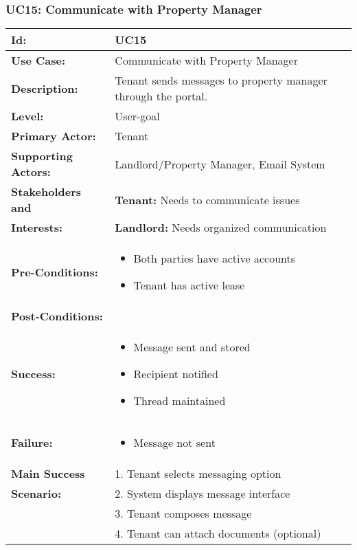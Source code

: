\documentclass[12pt]{article}
\begin{document}
\subsubsection{UC15: Communicate with Property Manager}

\begin{tabular}{|p{3cm}|p{11cm}|}
\hline
\textbf{Id:} & UC15 \\
\hline
\textbf{Use Case:} & Communicate with Property Manager \\
\hline
\textbf{Description:} & Tenant sends messages to property manager through the portal. \\
\hline
\textbf{Level:} & User-goal \\
\hline
\textbf{Primary Actor:} & Tenant \\
\hline
\textbf{Supporting Actors:} & Landlord/Property Manager, Email System \\
\hline
\textbf{Stakeholders and} & \textbf{Tenant:} Needs to communicate issues \\
\textbf{Interests:} & \textbf{Landlord:} Needs organized communication \\
\hline
\textbf{Pre-Conditions:} & 
\begin{itemize}
    \item Both parties have active accounts
    \item Tenant has active lease
\end{itemize} \\
\hline
\textbf{Post-Conditions:} & \\
\textbf{Success:} & 
\begin{itemize}
    \item Message sent and stored
    \item Recipient notified
    \item Thread maintained
\end{itemize} \\
\textbf{Failure:} & 
\begin{itemize}
    \item Message not sent
\end{itemize} \\
\hline
\textbf{Main Success} & 1. Tenant selects messaging option \\
\textbf{Scenario:} & 2. System displays message interface \\
& 3. Tenant composes message \\
& 4. Tenant can attach documents (optional) \\

\end{tabular}
\end{document}
